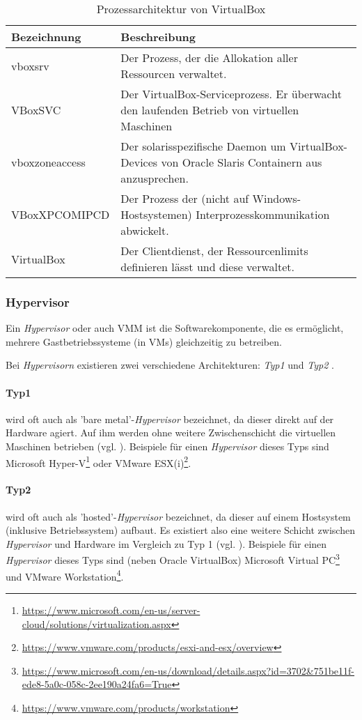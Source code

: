\begin{table}
    \begin{tabularx}{\textwidth}{|l||X|}
    \hline
      \textbf{Bezeichnung} & \textbf{Beschreibung} \\
    \hline
    \hline
      vboxsrv & Der Prozess, der die Allokation aller Ressourcen verwaltet. \\
    \hline
    \hline
      VBoxSVC & Der VirtualBox-Serviceprozess. Er überwacht den laufenden Betrieb von virtuellen Maschinen \\
    \hline
    \hline
      vboxzoneaccess & Der solarisspezifische Daemon um VirtualBox-Devices von Oracle Slaris Containern aus anzusprechen. \\
    \hline
    \hline
      VBoxXPCOMIPCD & Der Prozess der (nicht auf Windows-Hostsystemen) Interprozesskommunikation abwickelt. \\
    \hline
    \hline
      VirtualBox & Der Clientdienst, der Ressourcenlimits definieren lässt und diese verwaltet. \\
    \hline
    \end{tabularx}%
    \caption{Prozessarchitektur von VirtualBox}
\end{table}

\subsubsection[Hypervisor (Schenkel)]{Hypervisor}
\label{subsubsec:hypervisor}
Ein \textit{Hypervisor} oder auch \ac{VMM} ist die Softwarekomponente, die es ermöglicht,
mehrere Gastbetriebssysteme (in VMs) gleichzeitig zu betreiben.

Bei \textit{Hypervisorn} existieren zwei verschiedene Architekturen: \textit{Typ1} und
\textit{Typ2} \cite{dash13}.

\paragraph{Typ1} wird oft auch als 'bare metal'-\textit{Hypervisor} bezeichnet, da dieser direkt
auf der Hardware agiert. Auf ihm werden ohne weitere Zwischenschicht die virtuellen Maschinen
betrieben (vgl. ).
Beispiele für einen \textit{Hypervisor} dieses Typs sind Microsoft Hyper-V\footnote{\url{https://www.microsoft.com/en-us/server-cloud/solutions/virtualization.aspx}}
oder VMware ESX(i)\footnote{\url{https://www.vmware.com/products/esxi-and-esx/overview}}.

\paragraph{Typ2} wird oft auch als 'hosted'-\textit{Hypervisor} bezeichnet, da dieser auf
einem Hostsystem (inklusive Betriebssystem) aufbaut. Es existiert also eine weitere Schicht
zwischen \textit{Hypervisor} und Hardware im Vergleich zu Typ 1 (vgl. ).
Beispiele für einen \textit{Hypervisor} dieses Typs sind (neben Oracle VirtualBox) Microsoft
Virtual PC\footnote{\url{https://www.microsoft.com/en-us/download/details.aspx?id=3702&751be11f-ede8-5a0c-058c-2ee190a24fa6=True}} und
VMware Workstation\footnote{\url{https://www.vmware.com/products/workstation}}.

